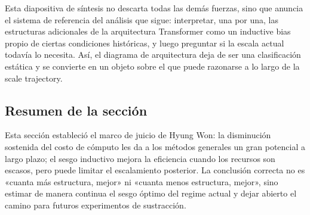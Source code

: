 Esta diapositiva de síntesis no descarta todas las demás fuerzas, sino que anuncia el sistema de referencia del análisis que sigue: interpretar, una por una, las estructuras adicionales de la arquitectura Transformer como un inductive bias propio de ciertas condiciones históricas, y luego preguntar si la escala actual todavía lo necesita. Así, el diagrama de arquitectura deja de ser una clasificación estática y se convierte en un objeto sobre el que puede razonarse a lo largo de la scale trajectory.

\subsection{Resumen de la sección}

Esta sección estableció el marco de juicio de Hyung Won: la disminución sostenida del costo de cómputo les da a los métodos generales un gran potencial a largo plazo; el sesgo inductivo mejora la eficiencia cuando los recursos son escasos, pero puede limitar el escalamiento posterior. La conclusión correcta no es «cuanta más estructura, mejor» ni «cuanta menos estructura, mejor», sino estimar de manera continua el sesgo óptimo del regime actual y dejar abierto el camino para futuros experimentos de sustracción.
